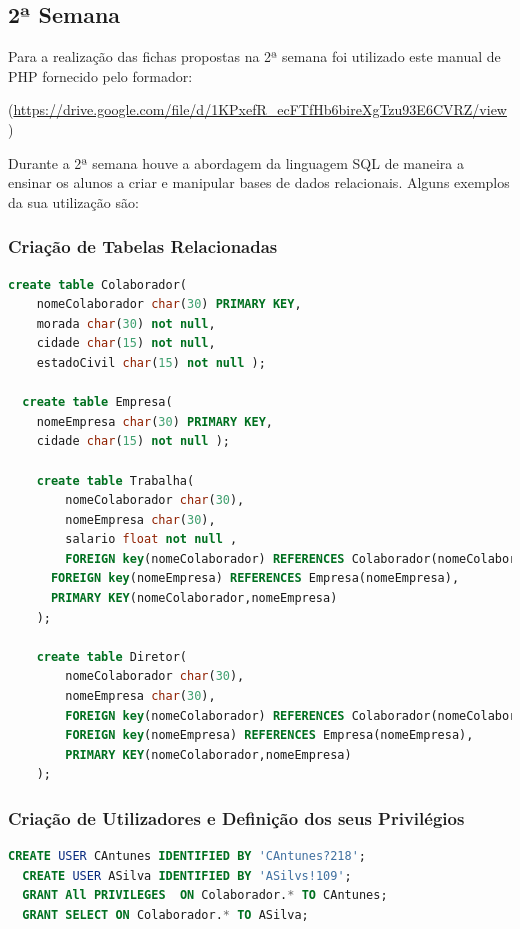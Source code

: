\documentclass[14pt]{article}
\begin{document}
\subsection{2ª Semana}

Para a realização das fichas propostas na 2ª semana foi utilizado este manual de PHP fornecido pelo formador:

(\url{https://drive.google.com/file/d/1KPxefR_ecFTfHb6bireXgTzu93E6CVRZ/view})

Durante a 2ª semana houve a abordagem da linguagem SQL de maneira a ensinar os alunos a criar e manipular bases de dados relacionais.
Alguns exemplos da sua utilização são:

\subsubsection{Criação de Tabelas Relacionadas }

\begin{lstlisting}[language=SQL]
  create table Colaborador(
    nomeColaborador char(30) PRIMARY KEY,
    morada char(30) not null,
    cidade char(15) not null,
    estadoCivil char(15) not null );

  create table Empresa(
    nomeEmpresa char(30) PRIMARY KEY,
    cidade char(15) not null );

    create table Trabalha(
    	nomeColaborador char(30),
    	nomeEmpresa char(30),
    	salario float not null ,
    	FOREIGN key(nomeColaborador) REFERENCES Colaborador(nomeColaborador),
      FOREIGN key(nomeEmpresa) REFERENCES Empresa(nomeEmpresa),
      PRIMARY KEY(nomeColaborador,nomeEmpresa)
    );

    create table Diretor(
      	nomeColaborador char(30),
      	nomeEmpresa char(30),
      	FOREIGN key(nomeColaborador) REFERENCES Colaborador(nomeColaborador),
        FOREIGN key(nomeEmpresa) REFERENCES Empresa(nomeEmpresa),
        PRIMARY KEY(nomeColaborador,nomeEmpresa)
    );

\end{lstlisting}

\subsubsection{Criação de Utilizadores e Definição dos seus Privilégios}

\begin{lstlisting}[language=SQL]
  CREATE USER CAntunes IDENTIFIED BY 'CAntunes?218';
  CREATE USER ASilva IDENTIFIED BY 'ASilvs!109';
  GRANT All PRIVILEGES  ON Colaborador.* TO CAntunes;
  GRANT SELECT ON Colaborador.* TO ASilva;
\end{lstlisting}
\newpage
\end{document}
